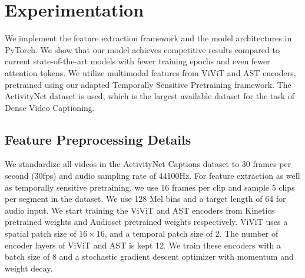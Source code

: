 \section{Experimentation}
\par We implement the feature extraction framework and the model architectures in PyTorch. We show that our model achieves competitive results compared to current state-of-the-art models with fewer training epochs and even fewer attention tokens. We utilize multimodal features from ViViT and AST encoders, pretrained using our adapted Temporally Sensitive Pretraining framework. The ActivityNet dataset is used, which is the largest available dataset for the task of Dense Video Captioning.

\subsection{Feature Preprocessing Details}
\par We standardize all videos in the ActivityNet Captions dataset to 30 frames per second (30fps) and audio sampling rate of 44100Hz. For feature extraction as well as temporally sensitive pretraining, we use 16 frames per clip and sample 5 clips per segment in the dataset. We use 128 Mel bins and a target length of 64 for audio input. We start training the ViViT and AST encoders from Kinetics pretrained weights and Audioset pretrained weights respectively. ViViT uses a spatial patch size of $16 \times 16$, and a temporal patch size of 2. The number of encoder layers of ViViT and AST is kept 12. We train these encoders with a batch size of 8 and a stochastic gradient descent optimizer with momentum and weight decay.

